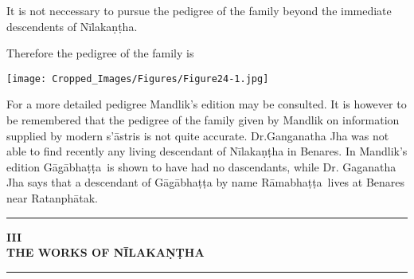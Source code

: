 \documentclass[11pt, openany]{book}
\begin{document}
It is not neccessary to pursue the pedigree of the family beyond the immediate descendents of Nīlakaṇṭha.


\newpage

Therefore the pedigree of the family is 

\begin{center}
\texttt{[image: Cropped\_Images/Figures/Figure24-1.jpg]}
\end{center}

For a more detailed pedigree Mandlik's edition may be consulted. It is however to be remembered that the pedigree of the family given by Mandlik on information supplied by modern s'āstris is not quite accurate. Dr.Ganganatha Jha was not able to find recently any living descendant of Nīlakaṇṭha in Benares. In Mandlik's edition Gāgābhaṭṭa~is shown to have had no dascendants, while Dr. Gaganatha Jha says that a descendant of Gāgābhaṭṭa by name Rāmabhaṭṭa~lives at Benares near {\qt Ratanphātak}.

\begin{center}
\rule{0.2\linewidth}{0.5pt}
\end{center}

\fancyhead[RE,LO]{\thepage}
\cfoot{}
\newpage
\renewcommand{\thepage}{\Roman{page}}
\setcounter{page}{17}


\begin{center}
\textbf{\large III}\\

\vspace{1mm}
\textbf{\large THE WORKS OF NĪLAKAṆṬHA}

\rule{0.2\linewidth}{0.5pt}
\end{center}
\end{document}
